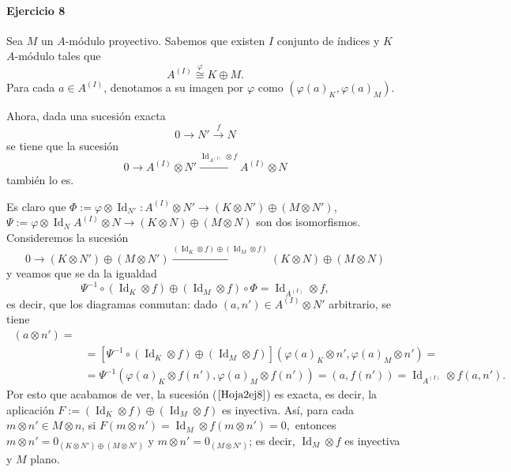 \documentclass[./ejercicios.tex]{subfiles}
\begin{document}
\paragraph{Ejercicio 8} Sea $M$ un $A$-módulo proyectivo. Sabemos que existen $I$ conjunto de índices y $K$ $A$-módulo tales que
$$A^{(I)}\overset{\varphi}{\cong} K\oplus M.$$
Para cada $a\in A^{(I)}$, denotamos a su imagen por $\varphi$ como $(\varphi(a)_K,\varphi(a)_M)$.

Ahora, dada una sucesión exacta
$$0\longrightarrow N'\overset{f}{\longrightarrow}N$$
se tiene que la sucesión
$$0\longrightarrow A^{(I)}\otimes N'\overset{\operatorname{Id}_{A^{(I)}}\otimes f}{\longrightarrow} A^{(I)}\otimes N$$
también lo es.

Es claro que $\Phi:=\varphi\otimes \operatorname{Id}_{N'}: A^{(I)}\otimes N'\longrightarrow (K\otimes N')\oplus(M\otimes N')$, $\Psi:=\varphi\otimes \operatorname{Id}_{N}A^{(I)}\otimes N\longrightarrow (K\otimes N)\oplus(M\otimes N)$ son dos isomorfismos. Consideremos la sucesión
\begin{equation}\label{Hoja2ej8}
0\longrightarrow (K\otimes N')\oplus(M\otimes N')\overset{(\operatorname{Id}_{K}\otimes f)\oplus (\operatorname{Id}_{M}\otimes f)}{\longrightarrow} (K\otimes N)\oplus(M\otimes N)
\end{equation}
y veamos que se da la igualdad
$$\Psi^{-1}\circ(\operatorname{Id}_{K}\otimes f)\oplus (\operatorname{Id}_{M}\otimes f)\circ\Phi=\operatorname{Id}_{A^{(I)}}\otimes f,$$
es decir, que los diagramas conmutan: dado $(a,n')\in A^{(I)}\otimes N'$ arbitrario, se tiene
\begin{align*}
[\Psi^{-1}\circ&(\operatorname{Id}_{K}\otimes f)\oplus (\operatorname{Id}_{M}\otimes f)\circ\Phi]\ (a\otimes n')=\\
&=[\Psi^{-1}\circ(\operatorname{Id}_{K}\otimes f)\oplus (\operatorname{Id}_{M}\otimes f)](\varphi(a)_K\otimes n',\varphi(a)_M\otimes n')=\\
&=\Psi^{-1}(\varphi(a)_K\otimes f(n'),\varphi(a)_M\otimes f(n'))=(a,f(n'))=\operatorname{Id}_{A^{(I)}}\otimes f(a,n').
\end{align*}
Por esto que acabamos de ver, la sucesión ($\ref{Hoja2ej8}$) es exacta, es decir, la aplicación $F:=(\operatorname{Id}_{K}\otimes f)\oplus (\operatorname{Id}_{M}\otimes f)$ es inyectiva.
Así, para cada $m\otimes n'\in M\otimes n$, si $F(m\otimes n')=\operatorname{Id}_{M}\otimes f(m\otimes n')=0,$ entonces $m\otimes n'=0_{(K\otimes N')\oplus(M\otimes N')}$ y $m\otimes n'=0_{(M\otimes N')}$; es decir, $\operatorname{Id}_{M}\otimes f$ es inyectiva y $M$ plano.
\end{document}
